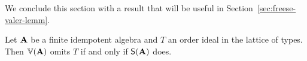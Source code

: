 \begin{comment}
  Table~\ref{tab:1} is from~\cite{MR3350327} and gives another characterization of
omitting types.
\begin{center}
  \begin{table}
    \caption{\cite{MR3350327}.}
    \label{tab:1}
    \begin{tabular}{|l|l|}
      \hline
      Omitting Class &  Equivalent Property\\
      \hline
      $\sM_{\{1\}}$ & satisfies a nontrivial idempotent \malcev condition \\
      \hline
      $\sM_{\{1,5\}}$ & satisfies a nontrivial congruence identity\\ %
      \hline
      $\sM_{\{1,4,5\}}$ & congruence n-permutable, for some $n > 1$ \\
      \hline
      $\sM_{\{1,2\}}$ & congruence meet semidistributive \\
      \hline
      $\sM_{\{1,2,5\}}$ & congruence join semidistributive\\ %
      \hline
      $\sM_{\{1,2,4,5\}}$ & congruence $n$-permutable for some $n$ and\\
      &congruence join semidistributive\\
      \hline
    \end{tabular}
  \end{table}
\end{center}

\end{comment}



We conclude this section with a result that will be useful in Section~\ref{sec:freese-valer-lemm}.
\begin{corollary}
  \label{cor:2.2}
  Let $\mathbf{A}$ be a finite idempotent algebra and $T$ an order ideal in the
  lattice of types. Then $\operatorname{\mathbb{V}}(\mathbf{A})$ omits $T$ if and only if $\mathsf{S}(\mathbf{A})$ does.
\end{corollary}




